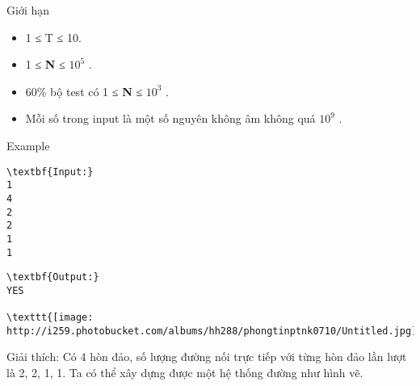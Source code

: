 Giới hạn
\begin{itemize}
	\item 1 ≤ T ≤ 10.
	\item 1 ≤ \textbf{ N } ≤ $10^{5}$ .
	\item 60\% bộ test có 1 ≤ \textbf{ N } ≤ $10^{3}$ .
	\item Mỗi số trong input là một số nguyên không âm không quá $10^{9}$ .
\end{itemize}
Example
\begin{verbatim}
\textbf{Input:}
1
4
2
2
1
1\end{verbatim}
\begin{verbatim}
\textbf{Output:}
YES

\texttt{[image: http://i259.photobucket.com/albums/hh288/phongtinptnk0710/Untitled.jpg]}\end{verbatim}

Giải thích: Có 4 hòn đảo, số lượng đường nối trực tiếp với từng hòn đảo lần lượt là 2, 2, 1, 1. Ta có thể xây dựng được một hệ thống đường như hình vẽ.